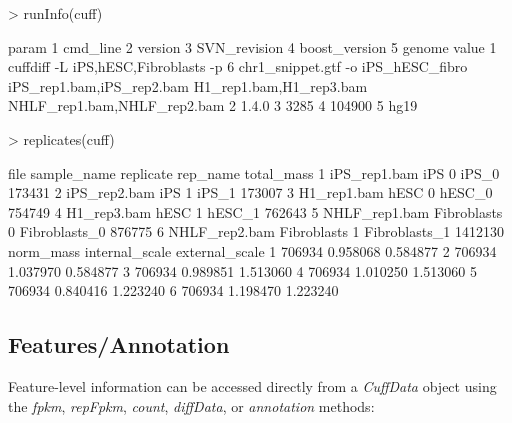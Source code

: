 \documentclass[10pt]{article}
\newcommand{\Rclass}[1]{{\textit{#1}}}
\newcommand{\Rmethod}[1]{{\textit{#1}}}
\begin{document}
\begin{Schunk}
\begin{Sinput}
> runInfo(cuff)
\end{Sinput}
\begin{Soutput}
          param
1      cmd_line
2       version
3  SVN_revision
4 boost_version
5        genome
                                                                                                                                                    value
1 cuffdiff -L iPS,hESC,Fibroblasts -p 6 chr1_snippet.gtf -o iPS_hESC_fibro iPS_rep1.bam,iPS_rep2.bam H1_rep1.bam,H1_rep3.bam NHLF_rep1.bam,NHLF_rep2.bam 
2                                                                                                                                                   1.4.0
3                                                                                                                                                    3285
4                                                                                                                                                  104900
5                                                                                                                                                    hg19
\end{Soutput}
\begin{Sinput}
> replicates(cuff)
\end{Sinput}
\begin{Soutput}
           file sample_name replicate      rep_name total_mass
1  iPS_rep1.bam         iPS         0         iPS_0     173431
2  iPS_rep2.bam         iPS         1         iPS_1     173007
3   H1_rep1.bam        hESC         0        hESC_0     754749
4   H1_rep3.bam        hESC         1        hESC_1     762643
5 NHLF_rep1.bam Fibroblasts         0 Fibroblasts_0     876775
6 NHLF_rep2.bam Fibroblasts         1 Fibroblasts_1    1412130
  norm_mass internal_scale external_scale
1    706934       0.958068       0.584877
2    706934       1.037970       0.584877
3    706934       0.989851       1.513060
4    706934       1.010250       1.513060
5    706934       0.840416       1.223240
6    706934       1.198470       1.223240
\end{Soutput}
\end{Schunk}

\subsection*{Features/Annotation}
Feature-level information can be accessed directly from a \Rclass{CuffData}
object using the \Rmethod{fpkm}, \Rmethod{repFpkm}, \Rmethod{count},
\Rmethod{diffData}, or \Rmethod{annotation} methods:
\end{document}
